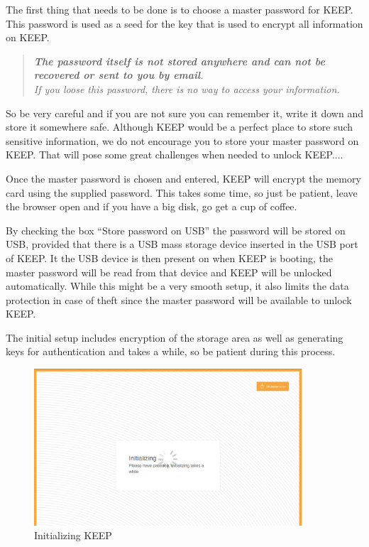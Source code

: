\documentclass[12pt,a4paper,titlepage]{article}
\begin{document}
The first thing that needs to be done is to choose a master password for KEEP. This password is used as a seed for the key that is used to encrypt all information on KEEP.

\begin{quote}
\emph{\textbf{The password itself is not stored anywhere and can not be recovered or sent to you by email}.\\
If you loose this password, there is no way to access your information.}
\end{quote}

So be very careful and if you are not sure you can remember it, write it down and store it somewhere safe. Although KEEP would be a perfect place to store such sensitive information, we do not encourage you to store your master password on KEEP.
That will pose some great challenges when needed to unlock KEEP....

Once the master password is chosen and entered, KEEP will encrypt the memory card using the supplied password. This takes some time, so just be patient, leave the browser open and if you have a big disk, go get a cup of coffee.

By checking the box ``Store password on USB'' the password will be stored on USB, provided that there is a USB mass storage device inserted in the USB port of KEEP. It the USB device is then present on when KEEP is booting, the master password will be read from that device and KEEP will be unlocked automatically. While this might be a very smooth setup, it also limits the data protection in case of theft since the master password will be available to unlock KEEP.

The initial setup includes encryption of the storage area as well as generating keys for authentication and takes a while, so be patient during this process.
\begin{figure}[h!]
\centering
\includegraphics[width=10cm]{./img/init}
\caption{Initializing KEEP}
\end{figure}
\end{document}
